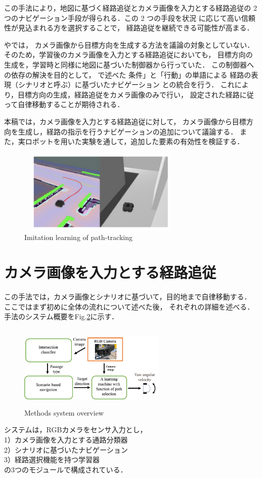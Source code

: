 \documentclass{sice-si}
\begin{document}
この手法により，地図に基づく経路追従とカメラ画像を入力とする経路追従の
2 つのナビゲーション手段が得られる．この 2 つの手段を状況
に応じて高い信頼性が見込まれる方を選択することで，
経路追従を継続できる可能性が高まる．\par
\cite{haruyama2022}や\cite{fujiwara2023}では，
カメラ画像から目標方向を生成する方法を議論の対象としていない．
そのため，学習後のカメラ画像を入力とする経路追従においても，
目標方向の生成を，学習時と同様に地図に基づいた制御器から行っていた．
この制御器への依存の解決を目的として，
\cite{haruyama2022}\cite{fujiwara2023}で述べた
条件」と「行動」の単語による
経路の表現（シナリオと呼ぶ）に基づいたナビゲーション
\cite{shimada2020}
との統合を行う．
これにより，目標方向の生成，経路追従をカメラ画像のみで行い，
設定された経路に従って自律移動することが期待される．
\par
本稿では，カメラ画像を入力とする経路追従に対して，
カメラ画像から目標方向を生成し，経路の指示を行うナビゲーションの追加について議論する．
また，実ロボットを用いた実験を通して，追加した要素の有効性を検証する．
\begin{figure}[htbp]
    \centering
     \includegraphics[height=40mm,width=80mm]{./figs/map_base.png}
     \caption{Imitation learning of path-tracking}\label{fig:mapbase}
\end{figure}

\section{カメラ画像を入力とする経路追従}
この手法では，カメラ画像とシナリオに基づいて，目的地まで自律移動する．
ここではまず初めに全体の流れについて述べた後，
それぞれの詳細を述べる．
手法のシステム概要をFig.\ref{fig:system}に示す．
\begin{figure}[h!]
    \centering
     \includegraphics[height=40mm,width=70mm]{./figs/system_gai.png}
     \caption{Methods system overview}\label{fig:system}
\end{figure}
\par
システムは，RGBカメラをセンサ入力とし，\\
1）カメラ画像を入力とする通路分類器\\
2）シナリオに基づいたナビゲーション\\
3）経路選択機能を持つ学習器\\
の3つのモジュールで構成されている．
\end{document}
